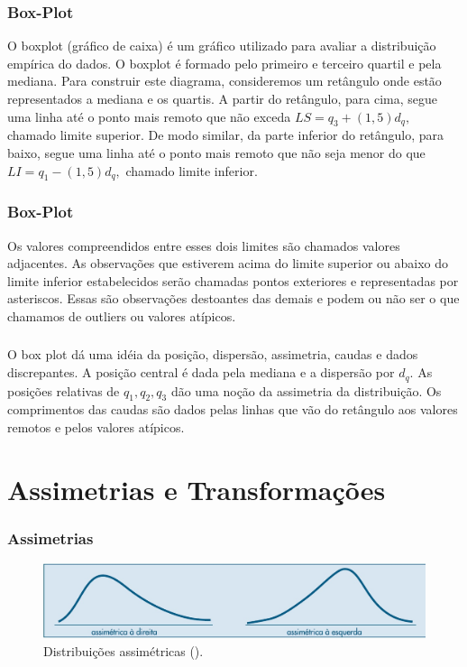 \documentclass[14pt,aspectratio=1610]{beamer}
\begin{document}
\begin{frame}{}
\frametitle{Box-Plot}
\begin{block}{}
\justifying
O boxplot (gráfico de caixa) é um gráfico utilizado para avaliar a distribuição empírica do dados. O boxplot é formado pelo primeiro e terceiro quartil e pela mediana. Para construir este diagrama, consideremos um retângulo onde estão representados a mediana e os quartis. A partir do retângulo, para cima, segue uma linha até o ponto mais remoto que não exceda $LS = q_{3} + (1,5)d_{q},$ chamado limite superior. De modo similar, da parte inferior do retângulo, para baixo, segue uma linha até o ponto mais remoto que não seja menor do que 
$LI = q_{1}-(1,5)d_{q},$ chamado limite inferior.
\end{block}
\end{frame}

\begin{frame}{}
\frametitle{Box-Plot}
\begin{block}{}
\justifying
Os valores compreendidos entre esses dois limites são chamados valores adjacentes. As observações que estiverem acima do limite superior ou abaixo do limite inferior estabelecidos serão chamadas pontos exteriores e representadas por asteriscos. Essas são observações destoantes das demais e
podem ou não ser o que chamamos de outliers ou valores atípicos.
\end{block}
\end{frame}

\begin{frame}{}
\frametitle{}
\begin{block}{}
\justifying
O box plot dá uma idéia da posição, dispersão, assimetria, caudas e dados discrepantes.
A posição central é dada pela mediana e a dispersão por $d_{q}.$ As posições relativas de $q_{1}, q_{2}, q_{3}$
dão uma noção da assimetria da distribuição. Os comprimentos das caudas são dados pelas
linhas que vão do retângulo aos valores remotos e pelos valores atípicos.
\end{block}
\end{frame}

\section{Assimetrias e Transformações}
\begin{frame}{}
\frametitle{Assimetrias}
\begin{figure}[H]
    \centering
    \includegraphics[height=0.4\textwidth,width=15cm]{Fig10}
    \caption{Distribuições assimétricas (\cite{Morettin09}).}
    \label{Fig10_ex}
  \end{figure}
\end{frame}
\end{document}
